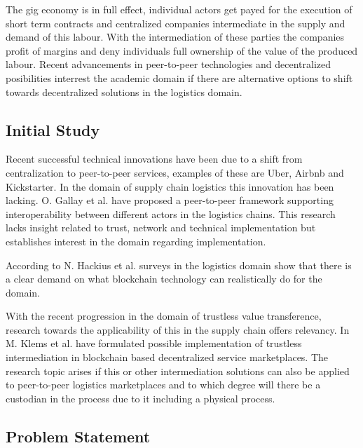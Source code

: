 The gig economy is in full effect, individual actors get payed for the execution of short term contracts and centralized companies intermediate in the supply and demand of this labour. With the intermediation of these parties the companies profit of margins and deny individuals full ownership of the value of the produced labour. Recent advancements in peer-to-peer technologies and decentralized posibilities interrest the academic domain if there are alternative options to shift towards decentralized solutions in the logistics domain.\par

\subsection{Initial Study}

Recent successful technical innovations have been due to a shift from centralization to peer-to-peer services, examples of these are Uber, Airbnb and Kickstarter. In the domain of supply chain logistics this innovation has been lacking. O. Gallay et al. \cite{peer-to-peerDecentralizedLogistics} have proposed a peer-to-peer framework supporting interoperability between different actors in the logistics chains. This research lacks insight related to trust, network and technical implementation but establishes interest in the domain regarding implementation. \par
According to N. Hackius et al. \cite{hackius2017blockchain} surveys in the logistics domain show that there is a clear demand on what blockchain technology can realistically do for the domain. \par
With the recent progression in the domain of trustless value transference, research towards the applicability of this in the supply chain offers relevancy. In \cite{trustlessIntermediationInBCServiceMarket} M. Klems et al. have formulated possible implementation of trustless intermediation in blockchain based decentralized service marketplaces. The research topic arises if this or other intermediation solutions can also be applied to peer-to-peer logistics marketplaces and to which degree will there be a custodian in the process due to it including a physical process.

\subsection{Problem Statement}

